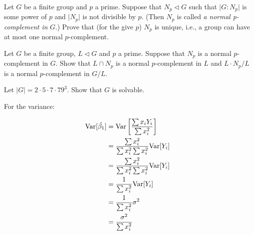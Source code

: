 \documentclass{article}
\begin{document}
\maketitle

\pagebreak

\begin{homeworkProblem}
    Let $G$ be a finite group and $p$ a prime.
    Suppose that $N_p \triangleleft G$ such that
    $\lvert G:N_p \rvert$ is some power of $p$ and 
    $\lvert N_p \rvert$ is not divisible by $p$.
    (Then $N_p$ is called \textit{a normal p-complement in} $G$.)
    Prove that (for the give $p$) $N_p$ is unique,
    i.e., a group can have at most one normal $p$-complement.\\
    \solution 




\end{homeworkProblem}

\pagebreak


\begin{homeworkProblem}
    Let $G$ be a finite group, $L \triangleleft G$ and $p$ a prime.
    Suppose that $N_p$ is a normal $p$-complement in $G$.
    Show that $L \cap N_p$ is a normal $p$-complement in $L$
    and $L \cdot N_p/L$ is a normal $p$-complement in $G/L$.\\
    \solution 
    

\end{homeworkProblem}

\pagebreak

\begin{homeworkProblem}
    Let $\lvert G \rvert = 2 \cdot 5 \cdot 7 \cdot 79^3$.
    Show that $G$ is solvable.\\
    \solution


    For the variance:

    \[
        \begin{split}
            \mathrm{Var}[\hat{\beta_1}]
            &= \mathrm{Var} \left[ \frac{
                \sum {x_i Y_i}
            }{
                \sum x_i^2
            }\right]
            \\
            &=
            \frac{
                \sum {x_i^2}
            }{
                \sum x_i^2 \sum x_i^2
            } \mathrm{Var}[Y_i]
            \\
            &=
            \frac{
                \sum {x_i^2}
            }{
                \sum x_i^2 \sum x_i^2
            } \mathrm{Var}[Y_i]
            \\
            &=
            \frac{
                1
            }{
                \sum x_i^2
            } \mathrm{Var}[Y_i]
            \\
            &=
            \frac{
                1
            }{
                \sum x_i^2
            } \sigma^2
            \\
            &=
            \frac{
                \sigma^2
            }{
                \sum x_i^2
            }
        \end{split}
    \]

\end{homeworkProblem}
\end{document}
